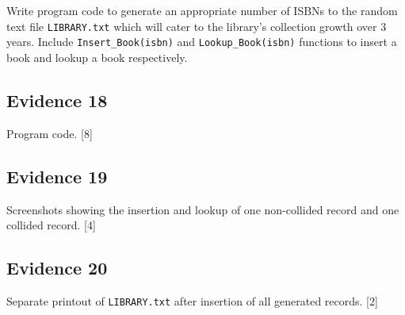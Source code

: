 Write program code to generate an appropriate number of ISBNs to the
random text file \texttt{LIBRARY.txt} which will cater to the library's
collection growth over 3 years. Include \texttt{Insert\_Book(isbn)}
and \texttt{Lookup\_Book(isbn)} functions to insert a book and lookup
a book respectively. 

\subsection*{Evidence 18}

Program code. \hfill{} {[}8{]}

\subsection*{Evidence 19 }

Screenshots showing the insertion and lookup of one non-collided record
and one collided record. \hfill{}{[}4{]}

\subsection*{Evidence 20 }

Separate printout of \texttt{LIBRARY.txt} after insertion of all generated
records. \hfill{} {[}2{]}